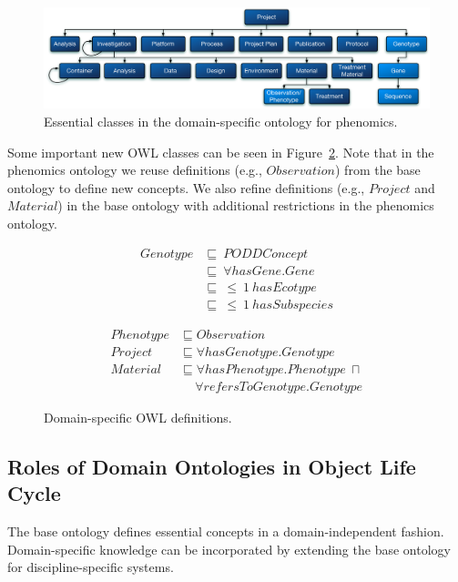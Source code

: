 \documentclass[preprint,12pt]{elsarticle}
\begin{document}
\begin{figure}[htb]
\centering
\includegraphics[width=\textwidth]{podd_ont.pdf}
\vspace{-16pt}
\caption{Essential classes in the domain-specific ontology for phenomics.}\label{fig:podd_ont}
\end{figure}

Some important new OWL classes can be seen in Figure~\ref{fig:phe_ont}. Note that in the phenomics ontology we reuse definitions (e.g., $Observation$) from the base ontology to define new concepts. We also refine definitions (e.g., $Project$ and $Material$) in the base ontology with additional restrictions in the phenomics ontology.

\begin{figure}[htb]
\small
\begin{minipage}[t]{.45\textwidth}
\centering
\begin{align*}
Genotype &\sqsubseteq~ PODDConcept\\
         &\sqsubseteq~ \forall hasGene.Gene\\
         &\sqsubseteq~ \leq~ 1~ hasEcotype\\
         &\sqsubseteq~ \leq~ 1~ hasSubspecies
\end{align*}
\end{minipage}
\begin{minipage}[t]{.4\textwidth}
\small\centering
\begin{align*}
Phenotype & \sqsubseteq Observation\\
Project & \sqsubseteq \forall hasGenotype.Genotype\\
Material & \sqsubseteq \forall hasPhenotype.Phenotype~\sqcap\\
         &\quad~ \forall refersToGenotype.Genotype
\end{align*}
\end{minipage}
\caption{Domain-specific OWL definitions.}\label{fig:phe_ont}
\end{figure}

\subsection{Roles of Domain Ontologies in Object Life Cycle}
The base ontology defines essential concepts in a domain-independent fashion. Domain-specific knowledge can be incorporated by extending the base ontology for discipline-specific systems.
\end{document}
